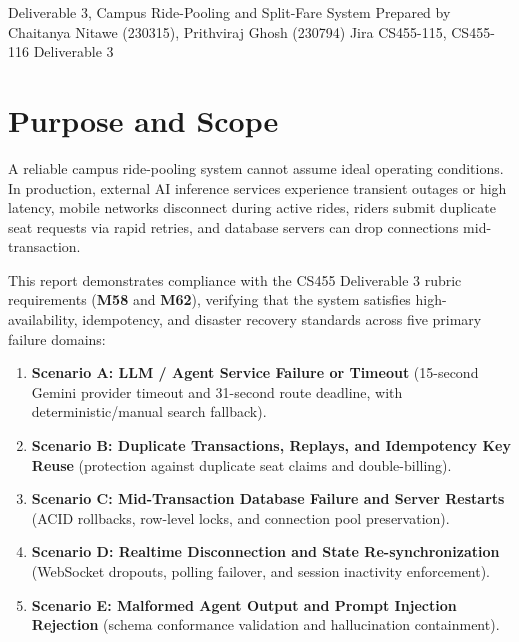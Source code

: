 \documentclass[10pt]{article}
\begin{document}
  {Deliverable 3, Campus Ride-Pooling and Split-Fare System}
  {Prepared by Chaitanya Nitawe (230315), Prithviraj Ghosh (230794) \quad Jira CS455-115, CS455-116 \quad Deliverable 3}


\section{Purpose and Scope}
A reliable campus ride-pooling system cannot assume ideal operating conditions. In production, external AI inference services experience transient outages or high latency, mobile networks disconnect during active rides, riders submit duplicate seat requests via rapid retries, and database servers can drop connections mid-transaction.

This report demonstrates compliance with the CS455 Deliverable 3 rubric requirements (\textbf{M58} and \textbf{M62}), verifying that the system satisfies high-availability, idempotency, and disaster recovery standards across five primary failure domains:
\begin{enumerate}
  \item \textbf{Scenario A: LLM / Agent Service Failure or Timeout} (15-second Gemini provider timeout and 31-second route deadline, with deterministic/manual search fallback).
  \item \textbf{Scenario B: Duplicate Transactions, Replays, and Idempotency Key Reuse} (protection against duplicate seat claims and double-billing).
  \item \textbf{Scenario C: Mid-Transaction Database Failure and Server Restarts} (ACID rollbacks, row-level locks, and connection pool preservation).
  \item \textbf{Scenario D: Realtime Disconnection and State Re-synchronization} (WebSocket dropouts, polling failover, and session inactivity enforcement).
  \item \textbf{Scenario E: Malformed Agent Output and Prompt Injection Rejection} (schema conformance validation and hallucination containment).
\end{enumerate}
\end{document}

